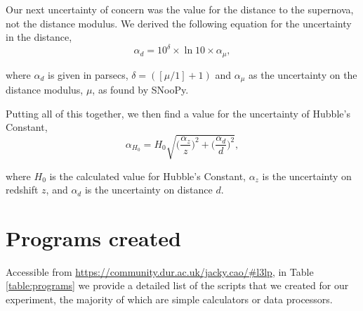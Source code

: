 \documentclass[twocolumn]{revtex4}
\begin{document}
Our next uncertainty of concern was the value for the distance to the supernova, not the distance modulus. We derived the following equation for the uncertainty in the distance,
\begin{equation}
\alpha_{d} = 10^{\delta} \times \ln{10} \times \alpha_{\mu}, 
\end{equation}

where $\alpha_{d}$ is given in parsecs, $\delta= ([\mu/1]+1)$ and $\alpha_{\mu}$ as the uncertainty on the distance modulus, $\mu$, as found by SNooPy. 

Putting all of this together, we then find a value for the uncertainty of Hubble's Constant,
\begin{equation}
\alpha_{H_0} = H_0 \sqrt{\Big(\frac{\alpha_z}{z}\Big)^2 + \Big(\frac{\alpha_d}{d}\Big)^2},
\end{equation}

where $H_0$ is the calculated value for Hubble's Constant, $\alpha_z$ is the uncertainty on redshift $z$, and $\alpha_d$ is the uncertainty on distance $d$.

\clearpage

\onecolumngrid
\vspace{-3ex}
\section{Programs created}
\vspace{-2ex}
Accessible from \url{https://community.dur.ac.uk/jacky.cao/#l3lp}, in Table \ref{table:programs} we provide a detailed list of the scripts that we created for our experiment, the majority of which are simple calculators or data processors.
\end{document}
